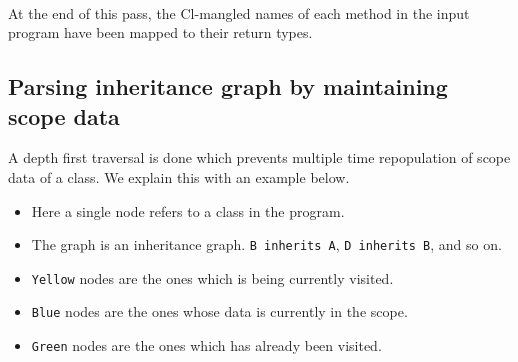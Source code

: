 \documentclass{article}
\begin{document}
~\\
At the end of this pass, the Cl-mangled names of each method in the input program have been mapped to their return types.

\subsection{Parsing inheritance graph by maintaining scope data}

A depth first traversal is done which prevents multiple time repopulation of scope data of a class. We explain this with an example below.
\begin{itemize}
	\item Here a single node refers to a class in the program.
	\item The graph is an inheritance graph. \verb|B inherits A|, \verb|D inherits B|, and so on.
	\item \verb|Yellow| nodes are the ones which is being currently visited.
	\item \verb|Blue| nodes are the ones whose data is currently in the scope.
	\item \verb|Green| nodes are the ones which has already been visited.
\end{itemize}
\end{document}
